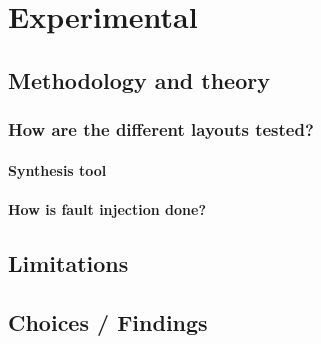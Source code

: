 \chapter{Experimental}
\label{chap4}

\section{Methodology and theory}
\label{sec:method}

\subsection{How are the different layouts tested?}
\subsubsection{Synthesis tool}
\subsubsection{How is fault injection done?}

\section{Limitations}
\label{sec:limit}

\section{Choices / Findings}
\label{sec:choice}